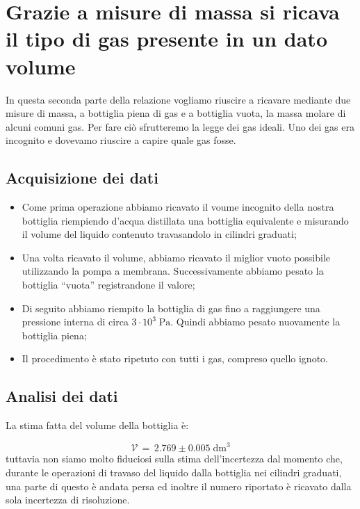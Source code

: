 \section{Grazie a misure di massa si ricava il tipo di gas presente in un dato volume}   

In questa seconda parte della relazione vogliamo riuscire a ricavare mediante due misure di massa,
a bottiglia piena di gas e a bottiglia vuota, la massa molare di alcuni comuni gas. Per fare ciò
sfrutteremo la legge dei gas ideali. Uno dei gas era incognito e dovevamo riuscire a capire quale gas fosse.

\subsection{Acquisizione dei dati}

\begin{itemize}
	\item{Come prima operazione abbiamo ricavato il voume incognito della nostra bottiglia riempiendo d'acqua distillata una bottiglia equivalente e misurando il volume del liquido contenuto travasandolo in cilindri graduati;}
	\item{Una volta ricavato il volume, abbiamo ricavato il miglior vuoto possibile utilizzando la pompa a membrana. Successivamente abbiamo pesato la bottiglia ``vuota'' registrandone il valore;}
	\item{Di seguito abbiamo riempito la bottiglia di gas fino a raggiungere una pressione interna di circa $3 \cdot 10^3 \; \si{\pascal}$. Quindi abbiamo pesato nuovamente la bottiglia piena;}
	\item{Il procedimento è stato ripetuto con tutti i gas, compreso quello ignoto.}
\end{itemize}

\subsection{Analisi dei dati}

La stima fatta del volume della bottiglia è:

\begin{equation}
	\mathcal{V} \, = \, 2.769 \pm 0.005 \; \si{\deci\meter}^3  
\end{equation}
%
tuttavia non siamo molto fiduciosi sulla stima dell'incertezza dal momento che, durante le operazioni di
travaso del liquido dalla bottiglia nei cilindri graduati, una parte di questo è andata persa ed inoltre
il numero riportato è ricavato dalla sola incertezza di risoluzione.

